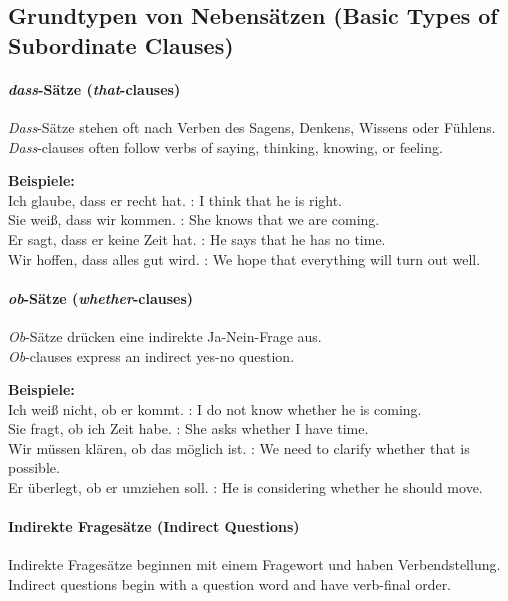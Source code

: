 \documentclass[a4paper]{article}
\begin{document}
    \subsection{Grundtypen von Nebensätzen {\small (Basic Types of Subordinate Clauses)}}
        
        \paragraph{\textit{dass}-Sätze {\small (\textit{that}-clauses)}}
            \textit{Dass}-Sätze stehen oft nach Verben des Sagens, Denkens, Wissens oder Fühlens.\\
            \textit{Dass}-clauses often follow verbs of saying, thinking, knowing, or feeling.
            
            \textbf{Beispiele:}\\
            Ich glaube, dass er recht hat. : I think that he is right.\\
            Sie weiß, dass wir kommen. : She knows that we are coming.\\
            Er sagt, dass er keine Zeit hat. : He says that he has no time.\\
            Wir hoffen, dass alles gut wird. : We hope that everything will turn out well.
        
        \paragraph{\textit{ob}-Sätze {\small (\textit{whether}-clauses)}}
            \textit{Ob}-Sätze drücken eine indirekte Ja-Nein-Frage aus.\\
            \textit{Ob}-clauses express an indirect yes-no question.
            
            \textbf{Beispiele:}\\
            Ich weiß nicht, ob er kommt. : I do not know whether he is coming.\\
            Sie fragt, ob ich Zeit habe. : She asks whether I have time.\\
            Wir müssen klären, ob das möglich ist. : We need to clarify whether that is possible.\\
            Er überlegt, ob er umziehen soll. : He is considering whether he should move.
        
        \paragraph{Indirekte Fragesätze {\small (Indirect Questions)}}
            Indirekte Fragesätze beginnen mit einem Fragewort und haben Verbendstellung.\\
            Indirect questions begin with a question word and have verb-final order.
            
\end{document}
